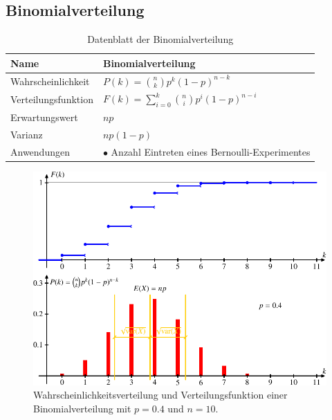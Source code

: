%
%
%
\subsection{Binomialverteilung} \label{section-binomialverteilung}
\begin{table}
\renewcommand{\arraystretch}{1.5}
\begin{center}
\begin{tabular}{|l|l|}
\hline
Name&Binomialverteilung\\
\hline
Wahrscheinlichkeit&
\begin{minipage}{3.7in}
\vskip3pt
$\displaystyle P(k)=\binom{n}{k}p^k(1-p)^{n-k}$
\end{minipage}
\\[10pt]
Verteilungsfunktion&
$\displaystyle F(k)=\sum_{i=0}^k\binom{n}{i}p^i(1-p)^{n-i}$
\\[10pt]
Erwartungswert&$\displaystyle np$\\
Varianz&$\displaystyle np(1-p)$\\
\hline
Anwendungen&\begin{minipage}{3.7in}%
\strut
$\bullet$ Anzahl Eintreten eines Bernoulli-Experimentes
\strut
\end{minipage}\\
\hline
\end{tabular}
\end{center}
\caption{Datenblatt der Binomialverteilung\label{datenblatt:binomialverteilung}}
\end{table}
\begin{figure}
\centering
\includegraphics{images/gl-3.pdf}
\caption{Wahrscheinlichkeitsverteilung und Verteilungsfunktion einer
Binomialverteilung mit $p=0.4$ und $n=10$.
\label{binomialgraph}}
\end{figure}

